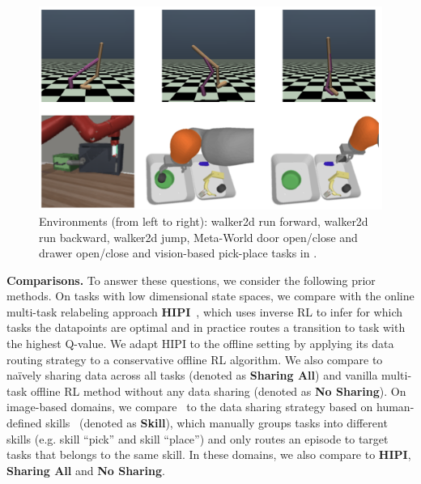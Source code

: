 \begin{figure}
    \vspace{-0.65cm}
    \centering
    \includegraphics[width=0.95\linewidth]{chapters/cds/env.png}
    \vspace{-0.32cm}
    \caption{\footnotesize  Environments (from left to right): walker2d {run forward}, walker2d {run backward}, walker2d {jump},  Meta-World {door open/close} and {drawer open/close} and vision-based pick-place tasks in \citep{kalashnikov2021mt}.}
    \label{fig:env}
    \vspace{-0.4cm}
\end{figure}
\textbf{Comparisons.} To answer these questions, we consider the following prior methods. On tasks with low dimensional state spaces, we compare with the online multi-task relabeling approach \textbf{HIPI}~\citep{eysenbach2020rewriting}, which uses inverse RL to infer for which tasks the datapoints are optimal and in practice routes a transition to task with the highest Q-value. We adapt HIPI to the offline setting by applying its data routing strategy to a conservative offline RL algorithm.
We also compare to na\"ively sharing data across all tasks (denoted as \textbf{Sharing All}) and vanilla multi-task offline RL method without any data sharing (denoted as \textbf{No Sharing}). On image-based domains, we compare \cdsmethodname\ to the data sharing strategy based on human-defined skills~\citep{kalashnikov2021mt} (denoted as \textbf{Skill}), which manually groups tasks into different skills (e.g. skill ``pick'' and skill ``place'') and only routes an episode to target tasks that belongs to the same skill.
In these domains, we also compare to \textbf{HIPI}, \textbf{Sharing All} and \textbf{No Sharing}.  
